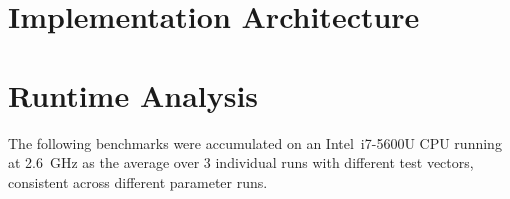 \section{Implementation Architecture}
\hierKoennteIhreWerbungStehen

\section{Runtime Analysis}
The following benchmarks were accumulated on an Intel\textregistered \, i7-5600U CPU running at \SI{2.6}{\giga\hertz} as the average over 3 individual runs with different test vectors, consistent across different parameter runs.
\hierKoennteIhreWerbungStehen
